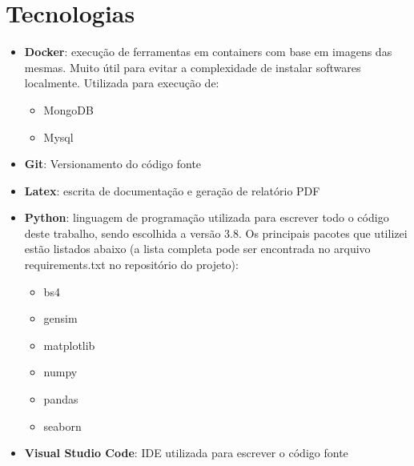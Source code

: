 \section{Tecnologias}

\begin{itemize}
    \item \textbf{Docker}: execução de ferramentas em containers com base em imagens das mesmas. Muito útil para evitar a complexidade de instalar softwares 
    localmente. Utilizada para execução de:
        \begin{itemize}
            \item MongoDB
            \item Mysql
        \end{itemize}
    \item \textbf{Git}: Versionamento do código fonte
    \item \textbf{Latex}: escrita de documentação e geração de relatório PDF
    \item \textbf{Python}: linguagem de programação utilizada para escrever todo o código deste trabalho, sendo escolhida a versão 3.8. Os principais pacotes que 
    utilizei estão listados abaixo (a lista completa pode ser encontrada no arquivo requirements.txt no repositório do projeto):
        \begin{itemize}
            \item bs4
            \item gensim
            \item matplotlib
            \item numpy
            \item pandas
            \item seaborn
        \end{itemize}
    \item \textbf{Visual Studio Code}: IDE utilizada para escrever o código fonte 
\end{itemize}